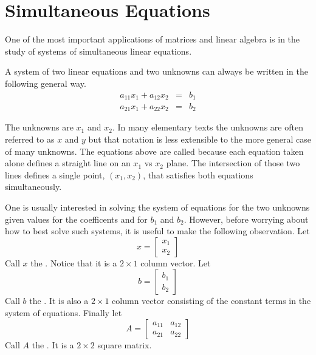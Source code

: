 
\section{Simultaneous Equations}
\label{sec:simul-equations}

One of the most important applications of matrices and linear algebra is in the study of systems
of simultaneous linear equations.

A system of two linear equations and two unknowns can always be written in the following general
way.
\begin{eqnarray*}
	a_{11}x_1 + a_{12}x_2 & = & b_1 \\
	a_{21}x_1 + a_{22}x_2 & = & b_2
\end{eqnarray*}

The unknowns are $x_1$ and $x_2$. In many elementary texts the unknowns are often referred to as
$x$ and $y$ but that notation is less extensible to the more general case of many unknowns. The
equations above are called  because each equation taken alone defines
a straight line on an $x_1$ vs $x_2$ plane. The intersection of those two lines defines a single
point, $(x_1, x_2)$, that satisfies both equations simultaneously.

One is usually interested in solving the system of equations for the two unknowns given values
for the coefficents and for $b_1$ and $b_2$. However, before worrying about how to best solve
such systems, it is useful to make the following observation. Let
\begin{displaymath}
x = \left[
\begin{array}{c}
  x_1 \\
  x_2
\end{array}
\right]
\end{displaymath}
Call $x$ the . Notice that it is a $2 \times 1$ column vector. Let
\begin{displaymath}
b = \left[
\begin{array}{c}
  b_1 \\
  b_2
\end{array}
\right]
\end{displaymath}
Call $b$ the . It is also a $2 \times 1$ column vector consisting of the
constant terms in the system of equations. Finally let
\begin{displaymath}
A = \left[
\begin{array}{cc}
a_{11} & a_{12} \\
a_{21} & a_{22}
\end{array}
\right]
\end{displaymath}
Call $A$ the . It is a $2 \times 2$ square matrix.


